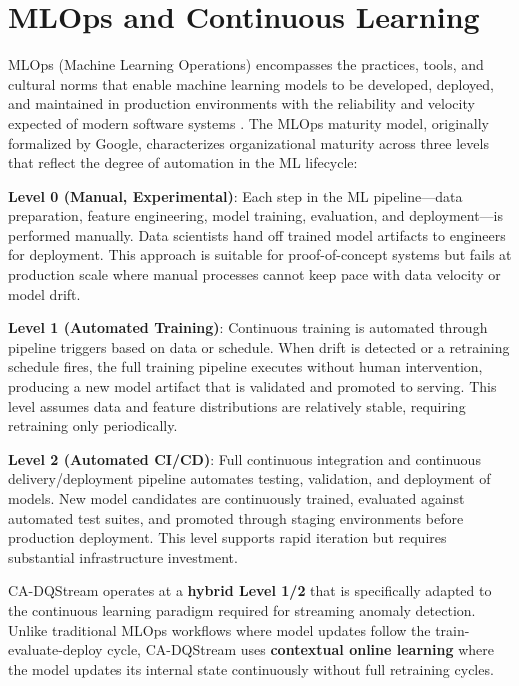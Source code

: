 \section{MLOps and Continuous Learning}

MLOps (Machine Learning Operations) encompasses the practices, tools, and cultural norms that enable machine learning models to be developed, deployed, and maintained in production environments with the reliability and velocity expected of modern software systems \citep{googlemlops2024}. The MLOps maturity model, originally formalized by Google, characterizes organizational maturity across three levels that reflect the degree of automation in the ML lifecycle:

\textbf{Level 0 (Manual, Experimental)}: Each step in the ML pipeline---data preparation, feature engineering, model training, evaluation, and deployment---is performed manually. Data scientists hand off trained model artifacts to engineers for deployment. This approach is suitable for proof-of-concept systems but fails at production scale where manual processes cannot keep pace with data velocity or model drift.

\textbf{Level 1 (Automated Training)}: Continuous training is automated through pipeline triggers based on data or schedule. When drift is detected or a retraining schedule fires, the full training pipeline executes without human intervention, producing a new model artifact that is validated and promoted to serving. This level assumes data and feature distributions are relatively stable, requiring retraining only periodically.

\textbf{Level 2 (Automated CI/CD)}: Full continuous integration and continuous delivery/deployment pipeline automates testing, validation, and deployment of models. New model candidates are continuously trained, evaluated against automated test suites, and promoted through staging environments before production deployment. This level supports rapid iteration but requires substantial infrastructure investment.

CA-DQStream operates at a \textbf{hybrid Level 1/2} that is specifically adapted to the continuous learning paradigm required for streaming anomaly detection. Unlike traditional MLOps workflows where model updates follow the train-evaluate-deploy cycle, CA-DQStream uses \textbf{contextual online learning} where the model updates its internal state continuously without full retraining cycles.

